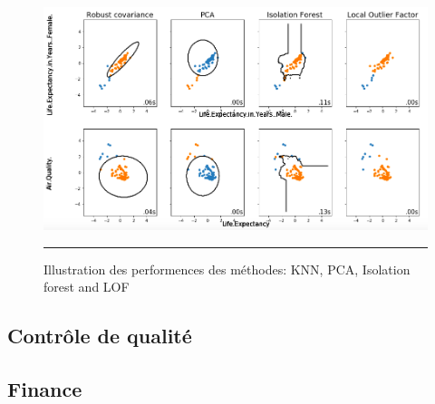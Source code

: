 \begin{figure}[t]
    \centering
    \includegraphics[width=\textwidth]{ADOA/Images/Allcomp1.png}

    \caption{Illustration des performences des méthodes: KNN, PCA, Isolation forest and LOF}\hrule
    \label{fig6}
\end{figure}
\subsection{Contrôle de qualité}
\subsection{Finance}


